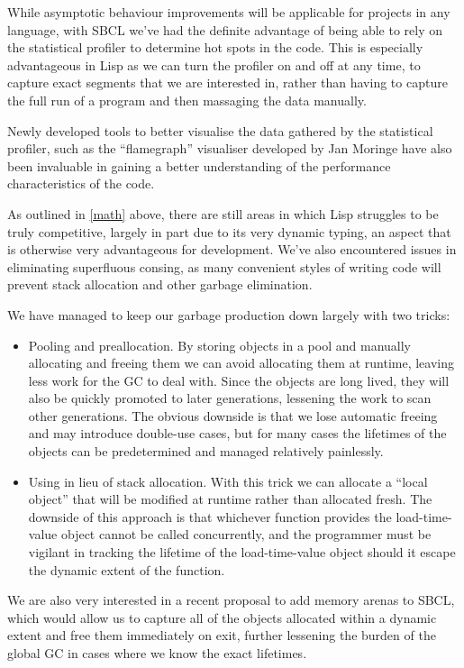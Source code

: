 \documentclass[format=sigconf]{acmart}
\begin{document}
While asymptotic behaviour improvements will be applicable for projects in any language, with SBCL we've had the definite advantage of being able to rely on the statistical profiler to determine hot spots in the code. This is especially advantageous in Lisp as we can turn the profiler on and off at any time, to capture exact segments that we are interested in, rather than having to capture the full run of a program and then massaging the data manually.

Newly developed tools to better visualise the data gathered by the statistical profiler, such as the ``flamegraph'' visualiser developed by Jan Moringe have also been invaluable in gaining a better understanding of the performance characteristics of the code.

As outlined in \autoref{math} above, there are still areas in which Lisp struggles to be truly competitive, largely in part due to its very dynamic typing, an aspect that is otherwise very advantageous for development. We've also encountered issues in eliminating superfluous consing, as many convenient styles of writing code will prevent stack allocation and other garbage elimination.

We have managed to keep our garbage production down largely with two tricks:

\begin{itemize}
\item Pooling and preallocation. By storing objects in a pool and manually allocating and freeing them we can avoid allocating them at runtime, leaving less work for the GC to deal with. Since the objects are long lived, they will also be quickly promoted to later generations, lessening the work to scan other generations. The obvious downside is that we lose automatic freeing and may introduce double-use cases, but for many cases the lifetimes of the objects can be predetermined and managed relatively painlessly.
\item Using  in lieu of stack allocation. With this trick we can allocate a ``local object'' that will be modified at runtime rather than allocated fresh. The downside of this approach is that whichever function provides the load-time-value object cannot be called concurrently, and the programmer must be vigilant in tracking the lifetime of the load-time-value object should it escape the dynamic extent of the function.
\end{itemize}

We are also very interested in a recent proposal to add memory arenas to SBCL, which would allow us to capture all of the objects allocated within a dynamic extent and free them immediately on exit, further lessening the burden of the global GC in cases where we know the exact lifetimes.
\end{document}
